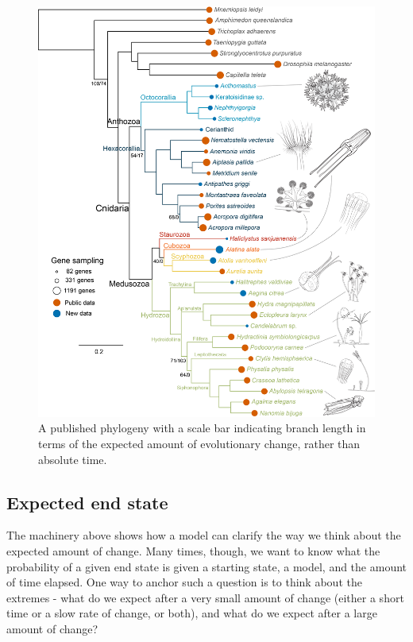 \documentclass[
]{book}
\begin{document}
\begin{figure}
\centering
\includegraphics{figures/Fig_cnidaria.png}
\caption{\label{fig:sim-tree-cnid}A published phylogeny \citep{zapata2015} with a scale bar indicating branch length in terms of the expected amount of evolutionary change, rather than absolute time.}
\end{figure}

\hypertarget{expected-end-state}{%
\subsection{Expected end state}\label{expected-end-state}}

The machinery above shows how a model can clarify the way we think about the expected amount of change. Many times, though, we want to know what the probability of a given end state is given a starting state, a model, and the amount of time elapsed. One way to anchor such a question is to think about the extremes - what do we expect after a very small amount of change (either a short time or a slow rate of change, or both), and what do we expect after a large amount of change?
\end{document}
